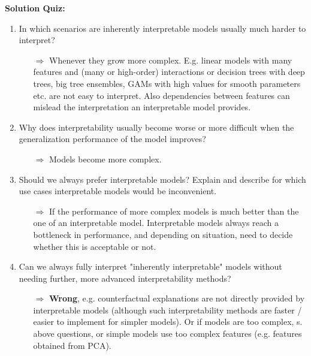 \textbf{Solution Quiz:}\\\noindent
\medskip

   	
	\begin{enumerate}
    
   	    \item In which scenarios are inherently interpretable models usually much harder to interpret?
    	\begin{itemize}
    		\item[$\Rightarrow$] Whenever they grow more complex. E.g. linear models with many features and (many or high-order) interactions or decision trees with deep trees, big tree ensembles, GAMs with high values for smooth parameters etc. are not easy to interpret. Also dependencies between features can mislead the interpretation an interpretable model provides.
    	\end{itemize}
    	\item Why does interpretability usually become worse or more difficult when the generalization performance of the model improves?
    	\begin{itemize}
    		\item[$\Rightarrow$] Models become more complex.
    	\end{itemize}
    	\item Should we always prefer interpretable models? Explain and describe for which use cases interpretable models would be inconvenient.
    	\begin{itemize}
    		\item[$\Rightarrow$] If the performance of more complex models is much better than the one of an interpretable model.
            Interpretable models always reach a bottleneck in performance, and depending on situation, need to decide whether this is acceptable or not.
    	\end{itemize}
        \item Can we always fully interpret "inherently interpretable" models without needing further, more advanced interpretability methods?
        \begin{itemize}
            \item[$\Rightarrow$] \textbf{Wrong}, e.g. counterfactual explanations are not directly provided by interpretable models (although such interpretability methods are faster / easier to implement for simpler models). Or if models are too complex, s. above questions, or simple models use too complex features (e.g. features obtained from PCA).


\end{itemize}
\end{enumerate}
